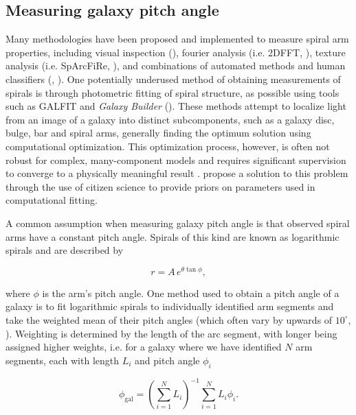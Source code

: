 \subsection{Measuring galaxy pitch angle}

Many methodologies have been proposed and implemented to measure spiral arm properties, including visual inspection (\citealt{2015A&A...582A..86H}), fourier analysis (i.e. \textsc{2DFFT}, \citealt{2012ApJS..199...33D}), texture analysis (i.e. SpArcFiRe, \citealt{2014ApJ...790...87D}), and combinations of automated methods and human classifiers (\citealt{2017MNRAS.472.2263H}, \citealt{2020MNRAS.493.3854H}). One potentially underused method of obtaining measurements of spirals is through photometric fitting of spiral structure, as possible using tools such as \textsc{GALFIT} \citep{2010AJ....139.2097P} and \textit{Galaxy Builder} (\Lingard). These methods attempt to localize light from an image of a galaxy into distinct subcomponents, such as a galaxy disc, bulge, bar and spiral arms, generally finding the optimum solution using computational optimization. This optimization process, however, is often not robust for complex, many-component models and requires significant supervision to converge to a physically meaningful result \citep{Gao2017:1709.00746v1}. \Lingard propose a solution to this problem through the use of citizen science to provide priors on parameters used in computational fitting.

A common assumption when measuring galaxy pitch angle is that observed spiral arms have a constant pitch angle. Spirals of this kind are known as logarithmic spirals and are described by

\begin{equation}
r = A\,e^{\theta\tan\phi},
\end{equation}

where $\phi$ is the arm's pitch angle. One method used to obtain a pitch angle of a galaxy is to fit logarithmic spirals to individually identified arm segments and take the weighted mean of their pitch angles (which often vary by upwards of $10^\circ$, \citealt{2014ApJ...790...87D}). Weighting is determined by the length of the arc segment, with longer being assigned higher weights, i.e. for a galaxy where we have identified $N$ arm segments, each with length $L_i$ and pitch angle $\phi_i$

\begin{equation}
  \phi_\mathrm{gal} = \left(\sum_{i=1}^{N}L_i\right)^{-1}\sum_{i=1}^{N}L_i \phi_i.
\end{equation}

